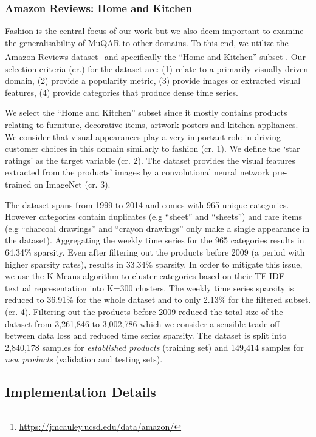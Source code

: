 \documentclass{article}
\begin{document}
\subsubsection{\textbf{Amazon Reviews: Home and Kitchen}}

Fashion is the central focus of our work but we also deem important to examine the generalisability of MuQAR to other domains. 
To this end, we utilize the Amazon Reviews dataset\footnote{\url{https://jmcauley.ucsd.edu/data/amazon/}} and specifically the ``Home and Kitchen'' subset \cite{mcauley2015image}. 
Our selection criteria (cr.) for the dataset are: 
(1) relate to a primarily visually-driven domain, 
(2) provide a popularity metric, 
(3) provide images or extracted visual features,
(4) provide categories that produce dense time series.

We select the ``Home and Kitchen'' subset since it mostly contains products relating to furniture, decorative items, artwork posters and kitchen appliances.
We consider that visual appearances play a very important role in driving customer choices in this domain similarly to fashion (cr. 1).
We define the ‘star ratings’ as the target variable (cr. 2). 
The dataset provides the visual features extracted from the products' images by a convolutional neural network pre-trained on ImageNet (cr. 3).

The dataset spans from 1999 to 2014 and comes with 965 unique categories. However categories contain duplicates (e.g ``sheet'' and ``sheets'') and rare items (e.g ``charcoal drawings'' and ``crayon drawings'' only make a single appearance in the dataset). 
Aggregating the weekly time series for the 965 categories results in 64.34\% sparsity.
Even after filtering out the products before 2009 (a period with higher sparsity rates), results in 33.34\% sparsity. 
In order to mitigate this issue, we use the K-Means algorithm to cluster categories based on their TF-IDF textual representation into K=300 clusters. 
The weekly time series sparsity is reduced to 36.91\% for the whole dataset and to only 2.13\% for the filtered subset. (cr. 4). 
Filtering out the products before 2009 reduced the total size of the dataset from 3,261,846 to 3,002,786 which we consider a sensible trade-off between data loss and reduced time series sparsity. 
The dataset is split into 2,840,178 samples for \textit{established products} (training set) and 149,414 samples for \textit{new products} (validation and testing sets).

\subsection{Implementation Details}
\end{document}
